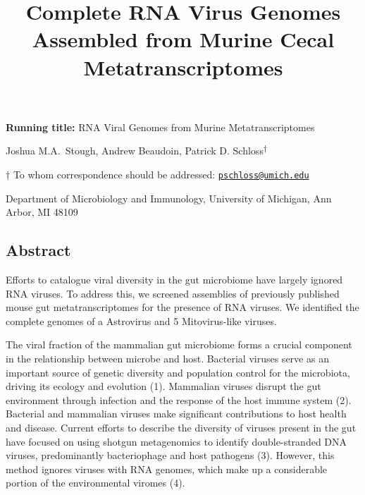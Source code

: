 \documentclass[11pt,]{article}
\title{\textbf{Complete RNA Virus Genomes Assembled from Murine Cecal
Metatranscriptomes}}
\date{}
\begin{document}
\maketitle

\vspace{35mm}

\textbf{Running title:} RNA Viral Genomes from Murine Metatranscriptomes

\vspace{35mm}

Joshua M.A.~Stough, Andrew Beaudoin, Patrick D.
Schloss\textsuperscript{\(\dagger\)}

\vspace{40mm}

\(\dagger\) To whom correspondence should be addressed:
\href{mailto:pschloss@umich.edu}{\nolinkurl{pschloss@umich.edu}}

Department of Microbiology and Immunology, University of Michigan, Ann
Arbor, MI 48109

\newpage
\linenumbers

\hypertarget{abstract}{%
\subsection{Abstract}\label{abstract}}

Efforts to catalogue viral diversity in the gut microbiome have largely
ignored RNA viruses. To address this, we screened assemblies of
previously published mouse gut metatranscriptomes for the presence of
RNA viruses. We identified the complete genomes of a Astrovirus and 5
Mitovirus-like viruses.

\newpage

The viral fraction of the mammalian gut microbiome forms a crucial
component in the relationship between microbe and host. Bacterial
viruses serve as an important source of genetic diversity and population
control for the microbiota, driving its ecology and evolution (1).
Mammalian viruses disrupt the gut environment through infection and the
response of the host immune system (2). Bacterial and mammalian viruses
make significant contributions to host health and disease. Current
efforts to describe the diversity of viruses present in the gut have
focused on using shotgun metagenomics to identify double-stranded DNA
viruses, predominantly bacteriophage and host pathogens (3). However,
this method ignores viruses with RNA genomes, which make up a
considerable portion of the environmental viromes (4).
\end{document}
